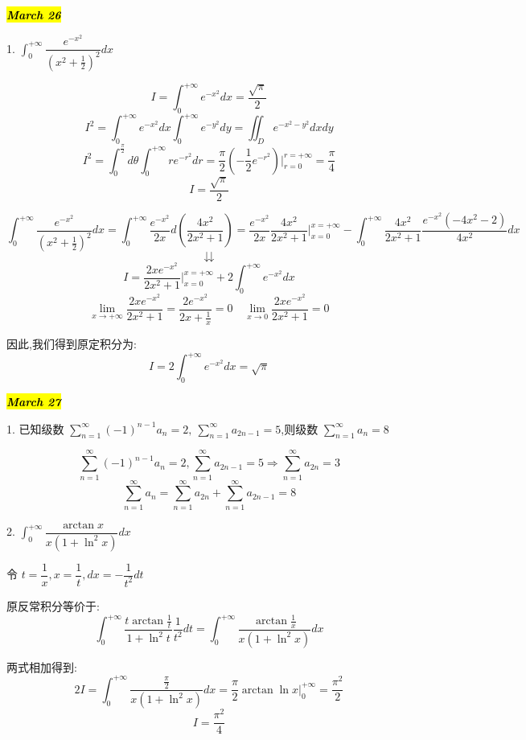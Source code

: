 \hl{\textbf{\textit{March 26}}}

1. $\int_{0}^{+\infty}\dfrac{e^{-x^2}}{(x^2+\frac{1}{2})^2}dx$
\begin{lemma}[特殊积分]\label{lem: 特殊积分}
	
	$$I=\int_{0}^{+\infty}e^{-x^2}dx=\frac{\sqrt{\pi}}{2}$$
	$$I^2=\int_{0}^{+\infty}e^{-x^2}dx\int_{0}^{+\infty}e^{-y^2}dy=\iint_{D}e^{-x^2-y^2}dxdy$$
	$$I^2=\int_{0}^{\frac{\pi}{2}}d\theta\int_{0}^{+\infty}re^{-r^2}dr=\frac{\pi}{2}(-\frac{1}{2}e^{-r^2})|_{r=0}^{r=+\infty}=\frac{\pi}{4}$$
	$$I=\frac{\sqrt{\pi}}{2}$$
\end{lemma}

\begin{solution}
	$$\int_{0}^{+\infty}\frac{e^{-x^2}}{(x^2+\frac{1}{2})^2}dx=\int_{0}^{+\infty}\frac{e^{-x^2}}{2x}d(\frac{4x^2}{2x^2+1})=\frac{e^{-x^2}}{2x}\frac{4x^2}{2x^2+1}|_{x=0}^{x=+\infty}-\int_{0}^{+\infty}\frac{4x^2}{2x^2+1}\frac{e^{-x^2}(-4x^2-2)}{4x^2}dx$$
	$$\downdownarrows$$
	$$I=\frac{2xe^{-x^2}}{2x^2+1}|_{x=0}^{x=+\infty}+2\int_{0}^{+\infty}e^{-x^2}dx$$
	$$\lim\limits_{x\rightarrow +\infty}\frac{2xe^{-x^2}}{2x^2+1}=\frac{2e^{-x^2}}{2x+\frac{1}{x}}=0 \quad \lim\limits_{x\rightarrow 0}\frac{2xe^{-x^2}}{2x^2+1}=0$$
	
	因此,我们得到原定积分为: 
	$$I=2\int_{0}^{+\infty}e^{-x^2}dx=\sqrt{\pi}$$
\end{solution}

\hl{\textbf{\textit{March 27}}}

1. 已知级数 $\sum\limits_{n=1}^{\infty}(-1)^{n-1}a_{n}=2,\ \sum\limits_{n=1}^{\infty}a_{2n-1}=5$,则级数 $\sum\limits_{n=1}^{\infty}a_{n}=8$
\begin{solution}
	
	$$\sum\limits_{n=1}^{\infty}(-1)^{n-1}a_{n}=2,\sum\limits_{n=1}^{\infty}a_{2n-1}=5\Rightarrow \sum\limits_{n=1}^{\infty}a_{2n}=3$$
	$$\sum\limits_{n=1}^{\infty}a_{n}=\sum\limits_{n=1}^{\infty}a_{2n}+\sum\limits_{n=1}^{\infty}a_{2n-1}=8$$
\end{solution}

2. $\int_{0}^{+\infty}\dfrac{\arctan x}{x(1+\ln^2 x)}dx$
\begin{solution}
	
	令 $t=\dfrac{1}{x},x=\dfrac{1}{t},dx=-\dfrac{1}{t^2}dt$
	
	原反常积分等价于: 
	$$\int_{0}^{+\infty}\frac{t\arctan \frac{1}{t}}{1+\ln^2 t}\frac{1}{t^2}dt=\int_{0}^{+\infty}\frac{\arctan \frac{1}{x}}{x(1+\ln^2 x)}dx$$
	
	两式相加得到: 
	$$2I=\int_{0}^{+\infty}\frac{\frac{\pi}{2}}{x(1+\ln^2 x)}dx=\frac{\pi}{2}\arctan \ln x|_{0}^{+\infty}=\frac{\pi^2}{2}$$
	$$I=\frac{\pi^2}{4}$$
\end{solution}

